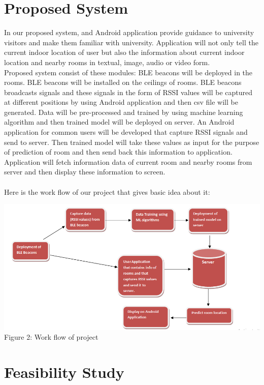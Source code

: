 \documentclass{article}
\begin{document}
\section{Proposed System}
In our proposed system, and Android application provide guidance to university visitors and make them familiar with university. Application will not only tell the current indoor location of user but also the information about current indoor location and nearby rooms in textual, image, audio or video form.
\\
Proposed system consist of these modules:
BLE beacons will be deployed in the rooms. BLE beacons will be installed on the ceilings of rooms.
BLE beacons broadcasts signals and these signals in the form of RSSI values will be captured at different positions by using Android application and then csv file will be generated.
Data will be pre-processed and trained by using machine learning algorithm and then trained model will be deployed on server.
An Android application for common users will be developed that capture RSSI signals and send to server. Then trained model will take these values as input for the purpose of prediction of room and then send back this information to application.
Application will fetch information data of current room and nearby rooms from server and then display these information to screen.
\\
\\
Here is the work flow of our project that gives basic idea about it:
\begin{center}
\includegraphics[scale=0.7]{diagram}
\\Figure 2: Work flow of project 
\end{center}

\section{Feasibility Study}
\end{document}
